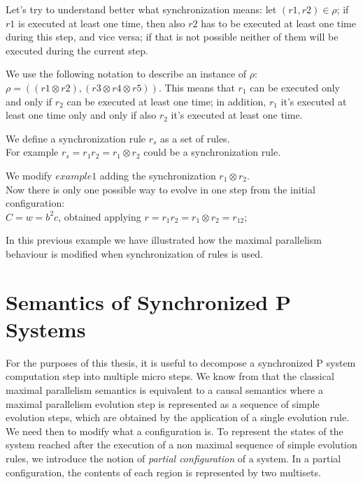 Let's try to understand better what synchronization means:
let $(r1,r2) \in \rho$; if $r1$ is executed at least one time, then also
$r2$ has to be executed at least one time during this step, and vice versa; if that is not possible neither of them will be executed during the current step.

We use the following notation to describe an instance of $\rho$: 
$\rho=((r1 \otimes r2),(r3 \otimes r4 \otimes r5))$.
This means that $r_1$ can be executed only and only if $r_2$ can be executed at least one time;
in addition, $r_1$ it's executed at least one time only and only if also $r_2$ it's executed at least one time.

\begin{definition}
\label{def:sync_rule}
We define a synchronization rule $r_s$ as a set of rules.\\
For example $r_s=r_1 r_2 = r_1 \otimes r_2$ could be a synchronization rule.
\end{definition}

\begin{example}
    We modify \hyperref[ex:flat_membrane]{$example 1$} adding the synchronization 
    $r_1 \otimes r_2$.\\
    Now there is only one possible way to evolve in one step from the initial configuration:\\
    $C=w=b^2c$, obtained applying $r=r_1 r_2=r_1 \otimes r_2=r_{12}$;
\end{example}

In this previous example we have illustrated how the maximal parallelism behaviour is modified when synchronization of rules is used.

\section{Semantics of Synchronized P Systems}

For the purposes of this thesis, it is useful to decompose a synchronized P system computation step into multiple micro steps.
We know from \cite{busi2007causality} that the classical maximal parallelism semantics is equivalent to a causal semantics where a maximal parallelism evolution step is represented as a sequence of simple evolution steps, which are obtained by the application of a single evolution rule.
We need then to modify what a configuration is.
To represent the states of the system reached after the execution of a non maximal sequence of simple evolution rules, we introduce the notion of \textit{partial configuration} of a system.
In a partial configuration, the contents of each region is represented by two multisets.

